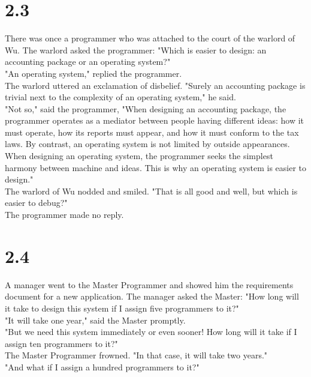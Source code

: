 \documentclass[14pt, letterpaper]{book}
\begin{document}
\section*{2.3}
There was once a programmer who was attached to the court of the warlord of Wu. The warlord asked the programmer: "Which is easier to design: an accounting package or an operating system?"\\

"An operating system," replied the programmer.\\

The warlord uttered an exclamation of disbelief. "Surely an accounting package is trivial next to the complexity of an operating system," he said.\\

"Not so," said the programmer, "When designing an accounting package, the programmer operates as a mediator between people having different ideas: how it must operate, how its reports must appear, and how it must conform to the tax laws. By contrast, an operating system is not limited by outside appearances. When designing an operating system, the programmer seeks the simplest harmony between machine and ideas. This is why an operating system is easier to design."\\

The warlord of Wu nodded and smiled. "That is all good and well, but which is easier to debug?"\\

The programmer made no reply.

\section*{2.4}
A manager went to the Master Programmer and showed him the requirements document for a new application. The manager asked the Master: "How long will it take to design this system if I assign five programmers to it?"\\

"It will take one year," said the Master promptly.\\

"But we need this system immediately or even sooner! How long will it take if I assign ten programmers to it?"\\

The Master Programmer frowned. "In that case, it will take two years."\\

"And what if I assign a hundred programmers to it?"\\
\end{document}
